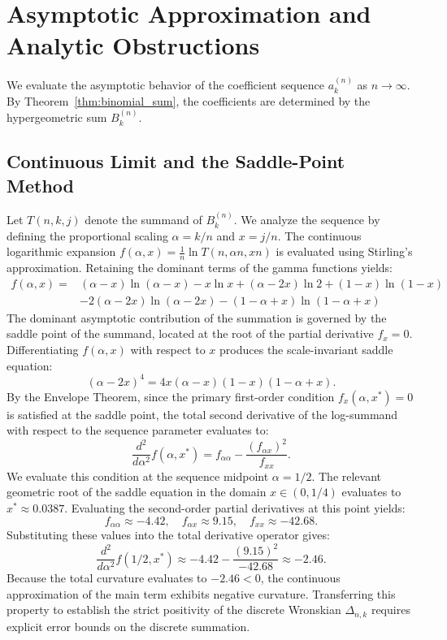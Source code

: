\documentclass[11pt]{article}
\begin{document}
\section{Asymptotic Approximation and Analytic Obstructions} \label{sec:AsympApprox}

We evaluate the asymptotic behavior of the coefficient sequence $a_k^{(n)}$ as $n \to \infty$. By Theorem~\ref{thm:binomial_sum}, the coefficients are determined by the hypergeometric sum $B_k^{(n)}$. 

\subsection{Continuous Limit and the Saddle-Point Method}

Let $T(n,k,j)$ denote the summand of $B_k^{(n)}$. We analyze the sequence by defining the proportional scaling $\alpha = k/n$ and $x = j/n$. The continuous logarithmic expansion $f(\alpha, x) = \frac{1}{n}\ln T(n, \alpha n, x n)$ is evaluated using Stirling's approximation. Retaining the dominant terms of the gamma functions yields:
\begin{align*}
f(\alpha,x)
={}&(\alpha-x)\ln(\alpha-x)-x\ln x +(\alpha-2x)\ln 2
+(1-x)\ln(1-x) \\
      & -2(\alpha-2x)\ln(\alpha-2x)
-(1-\alpha+x)\ln(1-\alpha+x)
\end{align*}
The dominant asymptotic contribution of the summation is governed by the saddle point of the summand, located at the root of the partial derivative $f_x = 0$. Differentiating $f(\alpha, x)$ with respect to $x$ produces the scale-invariant saddle equation:
\begin{equation*}
(\alpha - 2x)^4 = 4x(\alpha - x)(1 - x)(1 - \alpha + x).
\end{equation*}
By the Envelope Theorem, since the primary first-order condition $f_x(\alpha, x^*) = 0$ is satisfied at the saddle point, the total second derivative of the log-summand with respect to the sequence parameter evaluates to:
\begin{equation*}
\frac{d^2}{d\alpha^2} f(\alpha, x^*) = f_{\alpha\alpha} - \frac{(f_{\alpha x})^2}{f_{xx}}.
\end{equation*}
We evaluate this condition at the sequence midpoint $\alpha = 1/2$. The relevant geometric root of the saddle equation in the domain $x \in (0, 1/4)$ evaluates to $x^* \approx 0.0387$. Evaluating the second-order partial derivatives at this point yields:
\begin{equation*}
f_{\alpha\alpha} \approx -4.42, \quad f_{\alpha x} \approx 9.15, \quad f_{xx} \approx -42.68.
\end{equation*}
Substituting these values into the total derivative operator gives:
\begin{equation*}
\frac{d^2}{d\alpha^2} f(1/2, x^*) \approx -4.42 - \frac{(9.15)^2}{-42.68} \approx -2.46.
\end{equation*}
Because the total curvature evaluates to $-2.46 < 0$, the continuous approximation of the main term exhibits negative curvature. Transferring this property to establish the strict positivity of the discrete Wronskian $\Delta_{n,k}$ requires explicit error bounds on the discrete summation.
\end{document}
